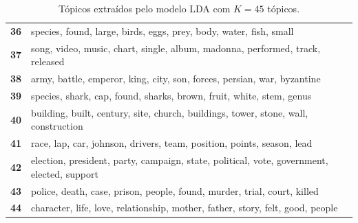 \begin{table}[htpb]
\begin{tabularx}{\textwidth}{@{}l X@{}}
        \textbf{36} & species, found, large, birds, eggs, prey, body, water, fish, small \\
        \textbf{37} & song, video, music, chart, single, album, madonna, performed, track, released \\
        \textbf{38} & army, battle, emperor, king, city, son, forces, persian, war, byzantine \\
        \textbf{39} & species, shark, cap, found, sharks, brown, fruit, white, stem, genus \\
        \textbf{40} & building, built, century, site, church, buildings, tower, stone, wall, construction \\
        \textbf{41} & race, lap, car, johnson, drivers, team, position, points, season, lead \\
        \textbf{42} & election, president, party, campaign, state, political, vote, government, elected, support \\
        \textbf{43} & police, death, case, prison, people, found, murder, trial, court, killed \\
        \textbf{44} & character, life, love, relationship, mother, father, story, felt, good, people \\
        \bottomrule
    \end{tabularx}
    \caption{Tópicos extraídos pelo modelo LDA com $K=45$ tópicos.}
    \label{tab:topicos_lda_45}
\end{table}
